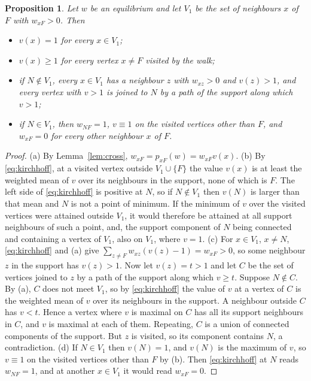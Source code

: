 \documentclass[11pt]{amsart}
\newtheorem{proposition}[theorem]{Proposition}
\theoremstyle{remark}
\begin{document}
\begin{proposition}\label{prop:volt}
Let $w$ be an equilibrium and let $V_1$ be the set of neighbours $x$ of $F$ with $w_{xF}>0$. Then
\begin{itemize}
\item[(a)] $v(x)=1$ for every $x\in V_1$;
\item[(b)] $v(x)\ge1$ for every vertex $x\ne F$ visited by the walk;
\item[(c)] if $N\notin V_1$, every $x\in V_1$ has a neighbour $z$ with $w_{xz}>0$ and $v(z)>1$, and every vertex
with $v>1$ is joined to $N$ by a path of the support along which $v>1$;
\item[(d)] if $N\in V_1$, then $w_{NF}=1$, $v\equiv1$ on the visited vertices other than $F$, and $w_{xF}=0$ for every other
neighbour $x$ of $F$.
\end{itemize}
\end{proposition}
\begin{proof}
(a) By Lemma~\ref{lem:cross}, $w_{xF}=p_{xF}(w)=w_{xF}v(x)$.
(b) By \eqref{eq:kirchhoff}, at a visited vertex outside $V_1\cup\{F\}$ the value $v(x)$ is at least the weighted mean
of $v$ over its neighbours in the support, none of which is $F$. The left side of \eqref{eq:kirchhoff} is positive at
$N$, so if $N\notin V_1$ then $v(N)$ is larger than that mean and $N$ is not a point of minimum. If the minimum of $v$
over the visited vertices were attained outside $V_1$, it would therefore be attained at all support neighbours of
such a point, and, the support component of
$N$ being connected and containing a vertex of $V_1$, also on $V_1$, where $v=1$.
(c) For $x\in V_1$, $x\neq N$, \eqref{eq:kirchhoff} and (a) give $\sum_{z\ne F}w_{xz}(v(z)-1)=w_{xF}>0$, so some
neighbour $z$ in the support has $v(z)>1$. Now let $v(z)=t>1$ and let $C$ be the set of vertices joined to $z$ by a
path of the support along which $v\ge t$. Suppose $N\notin C$. By (a), $C$ does not meet $V_1$, so by
\eqref{eq:kirchhoff} the value of $v$ at a vertex of $C$ is the weighted mean of $v$ over its neighbours in the
support. A neighbour outside $C$ has $v<t$. Hence a vertex where $v$ is maximal on $C$ has all its support neighbours
in $C$, and $v$ is maximal at each of them. Repeating, $C$ is a union of connected components of the support. But $z$
is visited, so its component contains $N$, a contradiction.
(d) If $N\in V_1$ then $v(N)=1$, and $v(N)$ is the maximum of $v$, so $v\equiv1$ on the visited vertices other than $F$ by (b).
Then \eqref{eq:kirchhoff} at $N$ reads $w_{NF}=1$, and at another $x\in V_1$ it would read $w_{xF}=0$.
\end{proof}
\end{document}
